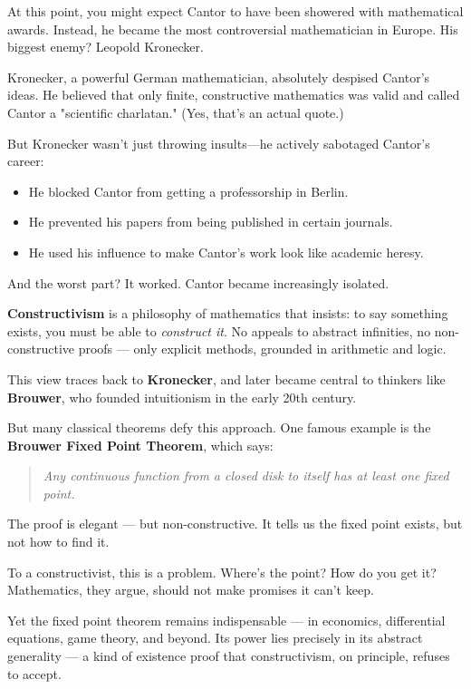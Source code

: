 At this point, you might expect Cantor to have been showered with mathematical awards. Instead, he became the most controversial mathematician in Europe. His biggest enemy? Leopold Kronecker.  

Kronecker, a powerful German mathematician, absolutely despised Cantor’s ideas. He believed that only finite, constructive mathematics was valid and called Cantor a "scientific charlatan." (Yes, that’s an actual quote.)  

But Kronecker wasn’t just throwing insults—he actively sabotaged Cantor’s career:

\begin{itemize}
    \item He blocked Cantor from getting a professorship in Berlin.
    \item He prevented his papers from being published in certain journals.
    \item He used his influence to make Cantor’s work look like academic heresy.
\end{itemize}

And the worst part? It worked. Cantor became increasingly isolated. 


\begin{tcolorbox}[colback=gray!5!white, colframe=black!80!white, title={Historical Sidenote: Constructivism and the Paradox of the Fixed Point}]

  \textbf{Constructivism} is a philosophy of mathematics that insists: to say something exists, you must be able to \textit{construct it}. No appeals to abstract infinities, no non-constructive proofs — only explicit methods, grounded in arithmetic and logic.
  
  This view traces back to \textbf{Kronecker}, and later became central to thinkers like \textbf{Brouwer}, who founded intuitionism in the early 20th century.
  
  \medskip
  
  But many classical theorems defy this approach. One famous example is the \textbf{Brouwer Fixed Point Theorem}, which says:
  
  \begin{quote}
  \textit{Any continuous function from a closed disk to itself has at least one fixed point.}
  \end{quote}
  
  The proof is elegant — but non-constructive. It tells us the fixed point exists, but not how to find it.
  
  \medskip
  
  To a constructivist, this is a problem. Where’s the point? How do you get it? Mathematics, they argue, should not make promises it can’t keep.
  
  Yet the fixed point theorem remains indispensable — in economics, differential equations, game theory, and beyond. Its power lies precisely in its abstract generality — a kind of existence proof that constructivism, on principle, refuses to accept.
  
\end{tcolorbox}


